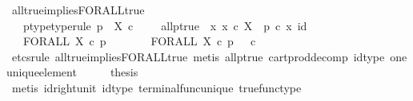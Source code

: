 \begin{isabellebody}
%
\endisatagproof
{\isafoldproof}%
%
\isadelimproof
\isanewline
%
\endisadelimproof
\isanewline
{}\isamarkupfalse%
\ all{\isacharunderscore}{\kern0pt}true{\isacharunderscore}{\kern0pt}implies{\isacharunderscore}{\kern0pt}FORALL{\isacharunderscore}{\kern0pt}true{}{\isacharcolon}{\kern0pt}\isanewline
\ \ \ p{\isacharunderscore}{\kern0pt}type{\isacharbrackleft}{\kern0pt}type{\isacharunderscore}{\kern0pt}rule{\isacharbrackright}{\kern0pt}{\isacharcolon}{\kern0pt}\ {\isachardoublequoteopen}p\ {\isacharcolon}{\kern0pt}\ X\ {\isasymtimes}\isactrlsub c\ {\isasymone}\ {\isasymrightarrow}\ {\isasymOmega}{\isachardoublequoteclose}\ \ all{\isacharunderscore}{\kern0pt}p{\isacharunderscore}{\kern0pt}true{\isacharcolon}{\kern0pt}\ {\isachardoublequoteopen}{\isasymAnd}\ x{\isachardot}{\kern0pt}\ x\ {\isasymin}\isactrlsub c\ X\ {\isasymLongrightarrow}\ p\ {\isasymcirc}\isactrlsub c\ {\isasymlangle}x{\isacharcomma}{\kern0pt}\ id\ {\isasymone}{\isasymrangle}\ {\isacharequal}{\kern0pt}\ {\isasymt}{\isachardoublequoteclose}\isanewline
\ \ \ {\isachardoublequoteopen}FORALL\ X\ {\isasymcirc}\isactrlsub c\ p\isactrlsup {\isasymsharp}\ {\isacharequal}{\kern0pt}\ {\isasymt}{\isachardoublequoteclose}\isanewline
%
\isadelimproof
%
\endisadelimproof
%
\isatagproof
{}\isamarkupfalse%
\ {\isacharminus}{\kern0pt}\isanewline
\ \ \isamarkupfalse%
\ {\isachardoublequoteopen}FORALL\ X\ {\isasymcirc}\isactrlsub c\ p\isactrlsup {\isasymsharp}\ {\isacharequal}{\kern0pt}\ {\isasymt}\ {\isasymcirc}\isactrlsub c\ {\isasymbeta}\isactrlbsub {\isasymone}\isactrlesub {\isachardoublequoteclose}\isanewline
\ \ \ \ \isamarkupfalse%
\ {\isacharparenleft}{\kern0pt}etcs{\isacharunderscore}{\kern0pt}rule\ all{\isacharunderscore}{\kern0pt}true{\isacharunderscore}{\kern0pt}implies{\isacharunderscore}{\kern0pt}FORALL{\isacharunderscore}{\kern0pt}true{}{\isacharcomma}{\kern0pt}\ metis\ all{\isacharunderscore}{\kern0pt}p{\isacharunderscore}{\kern0pt}true\ cart{\isacharunderscore}{\kern0pt}prod{\isacharunderscore}{\kern0pt}decomp\ id{\isacharunderscore}{\kern0pt}type\ one{\isacharunderscore}{\kern0pt}unique{\isacharunderscore}{\kern0pt}element{\isacharparenright}{\kern0pt}\isanewline
\ \ \isamarkupfalse%
\ \isamarkupfalse%
\ {\isacharquery}{\kern0pt}thesis\isanewline
\ \ \ \ \isamarkupfalse%
\ {\isacharparenleft}{\kern0pt}metis\ id{\isacharunderscore}{\kern0pt}right{\isacharunderscore}{\kern0pt}unit{}\ id{\isacharunderscore}{\kern0pt}type\ terminal{\isacharunderscore}{\kern0pt}func{\isacharunderscore}{\kern0pt}unique\ true{\isacharunderscore}{\kern0pt}func{\isacharunderscore}{\kern0pt}type{\isacharparenright}{\kern0pt}\isanewline

\end{isabellebody}

